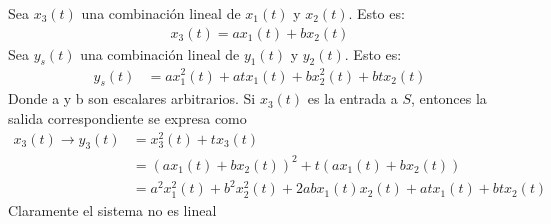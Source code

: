 \documentclass{article}
\begin{document}
Sea $x_3(t)$ una combinación lineal de $x_1(t)$ y $x_2(t).$ Esto es:\\
\begin{align}
x_3(t) = ax_1(t) + bx_2(t)
\end{align}
Sea $y_s(t)$ una combinación lineal de $y_1(t)$ y $y_2(t).$ Esto es:\\
\begin{align}
y_s(t) &= ax_1^2(t) + atx_1(t) + bx_2^2(t) + btx_2(t)
\end{align}
Donde a y b son escalares arbitrarios. Si $x_3(t) $ es la entrada a $S$, entonces la salida correspondiente se expresa como\\
\begin{align}
x_3(t) \rightarrow y_3(t) &= x_3^2(t) + tx_3(t)\\ 
						  &= (ax_1(t) + bx_2(t))^2 + t(ax_1(t) + bx_2(t))\\
						  &= a^2x_1^2(t) + b^2x_2^2(t) + 2abx_1(t)x_2(t) + atx_1(t) + btx_2(t)
\end{align}
Claramente el sistema no es lineal
\end{document}

